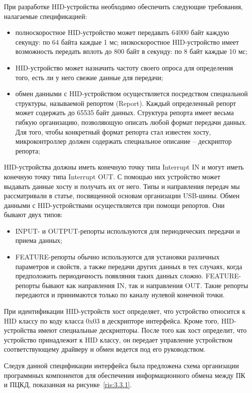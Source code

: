 При разработке HID-устройства необходимо обеспечить следующие требования,
налагаемые спецификацией:
\begin{itemize}
  \item полноскоростное HID-устройство может передавать 64000 байт каждую секунду: по
64 байта каждые 1 мс; низкоскоростное HID-устройство имеет возможность передать
вплоть до 800 байт в секунду: по 8 байт каждые 10 мс;
\item HID-устройство может
назначить частоту своего опроса для определения того, есть ли у него свежие
данные для передачи;
\item обмен данными с HID-устройством осуществляется
посредством специальной структуры, называемой репортом (Report). Каждый
определенный репорт может содержать до 65535 байт данных. Структура репорта
имеет весьма гибкую организацию, позволяющую описать любой формат передачи
данных. Для того, чтобы конкретный формат репорта стал известен хосту,
микроконтроллер должен содержать специальное описание – дескриптор репорта;
\end{itemize}

HID-устройства должны иметь конечную точку
типа Interrupt IN и могут иметь конечную точку типа Interrupt OUT. С помощью них
устройство может выдавать данные хосту и получать их от него. Типы и направления
передач мы рассматривали в статье, посвященной основам организации USB-шины.
Обмен данными с HID-устройствами осуществляется при помощи репортов. Они бывают
двух типов:
\begin{itemize}
  \item INPUT- и OUTPUT-репорты используются для периодических передачи и приема
данных;
\item FEATURE-репорты обычно используются для установки различных
параметров и свойств, а также передачи других данных в тех случаях, когда
предположить периодичность появляния таких данных сложно. FEATURE-репорты бывают как
направления IN, так и направления OUT. Такие репорты передаются и принимаются
только по каналу нулевой конечной точки.
\end{itemize}

При идентификации HID-устройств хост определяет, что устройство относится к HID
классу по коду класса 0x03 в дескрипторе интерфейса. Кроме того, HID-устройства
имеют специальные дескрипторы. После того как хост определит, что устройство
принадлежит к HID классу, он передает управление устройством соответствующему
драйверу и обмен  ведется под его руководством.~\cite{kozlov}

Следуя данной спецификации интерфейса была предложена схема организации
программных компонентов для обеспечения информационного обмена между ПК и ПЦКД,
показанная на рисунке~\ref{ris:3.3.1}.

